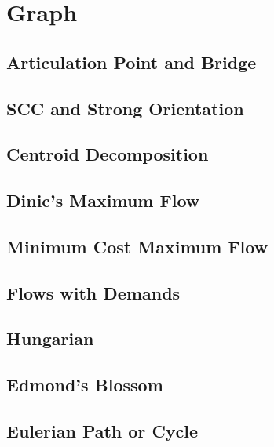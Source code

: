 \section{Graph}
\subsection{Articulation Point and Bridge}

\subsection{SCC and Strong Orientation}

\subsection{Centroid Decomposition}

\subsection{Dinic's Maximum Flow}

\subsection{Minimum Cost Maximum Flow}

\subsection{Flows with Demands}

\subsection{Hungarian}

\subsection{Edmond's Blossom}

\subsection{Eulerian Path or Cycle}

